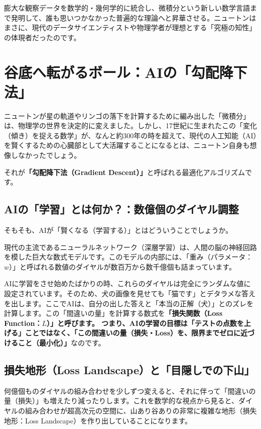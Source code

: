 膨大な観察データを数学的・幾何学的に統合し、微積分という新しい数学言語まで発明して、誰も思いつかなかった普遍的な理論へと昇華させる。ニュートンはまさに、現代のデータサイエンティストや物理学者が理想とする「究極の知性」の体現者だったのです。

\section{谷底へ転がるボール：AIの「勾配降下法」}

ニュートンが星の軌道やリンゴの落下を計算するために編み出した「微積分」は、物理学の世界を決定的に変えました。しかし、17世紀に生まれたこの「変化（傾き）を捉える数学」が、なんと約300年の時を超えて、現代の人工知能（AI）を賢くするための心臓部として大活躍することになるとは、ニュートン自身も想像しなかったでしょう。

それが\textbf{「勾配降下法（Gradient Descent）」}と呼ばれる最適化アルゴリズムです。

\subsection{AIの「学習」とは何か？：数億個のダイヤル調整}

そもそも、AIが「賢くなる（学習する）」とはどういうことでしょうか。

現代の主流であるニューラルネットワーク（深層学習）は、人間の脳の神経回路を模した巨大な数式モデルです。このモデルの内部には、「重み（パラメータ：\(w\)）」と呼ばれる数値のダイヤルが数百万から数千億個も詰まっています。

AIに学習をさせ始めたばかりの時、これらのダイヤルは完全にランダムな値に設定されています。そのため、犬の画像を見せても「猫です」とデタラメな答えを出します。ここでAIは、自分の出した答えと「本当の正解（犬）」とのズレを計算します。この「間違いの量」を計算する数式を\textbf{「損失関数（Loss Function：\(L\)）」と呼びます。 つまり、AIの学習の目標は「テストの点数を上げる」ことではなく、「この間違いの量（損失・Loss）を、限界までゼロに近づけること（最小化）」}なのです。

\subsection{損失地形（Loss Landscape）と「目隠しでの下山」}

何億個ものダイヤルの組み合わせを少しずつ変えると、それに伴って「間違いの量（損失）」も増えたり減ったりします。これを数学的な視点から見ると、ダイヤルの組み合わせが超高次元の空間に、山あり谷ありの非常に複雑な地形（損失地形：Loss Landscape）を作り出していることになります。

